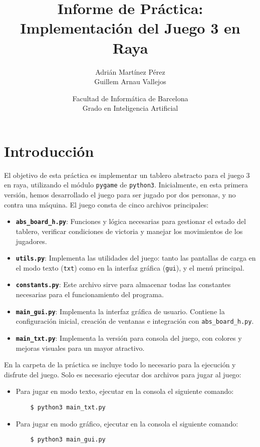 \documentclass[a4paper,12pt]{article}
\begin{document}
\title{Informe de Práctica: Implementación del Juego 3 en Raya}
\author{Adrián Martínez Pérez \\ Guillem Arnau Vallejos}
\date{Facultad de Informática de Barcelona\\Grado en Inteligencia Artificial}


\maketitle

\tableofcontents

\section*{Introducción}
El objetivo de esta práctica es implementar un tablero abstracto para el juego 3 en raya, utilizando el módulo
\texttt{pygame} de \texttt{python3}. Inicialmente, en esta primera versión, hemos desarrollado el juego para ser
 jugado por dos personas, y no contra una máquina. El juego consta de cinco archivos principales:

\begin{itemize}
    \item \textbf{\texttt{abs\_board\_h.py}}: Funciones y lógica necesarias para gestionar el estado del tablero,
    verificar condiciones de victoria y manejar los movimientos de los jugadores.
    \item \textbf{\texttt{utils.py}}: Implementa las utilidades del juego: tanto las pantallas de carga en el modo texto
    (\texttt{txt}) como en la interfaz gráfica (\texttt{gui}), y el menú principal.
    \item \textbf{\texttt{constants.py}}: Este archivo sirve para almacenar todas las constantes necesarias para el
    funcionamiento del programa.
    \item \textbf{\texttt{main\_gui.py}}: Implementa la interfaz gráfica de usuario. Contiene la configuración inicial,
    creación de ventanas e integración con \texttt{abs\_board\_h.py}.
    \item \textbf{\texttt{main\_txt.py}}: Implementa la versión para consola del juego, con colores y mejoras visuales
    para un mayor atractivo.
\end{itemize}

En la carpeta de la práctica se incluye todo lo necesario para la ejecución y disfrute del juego. Solo es necesario
ejecutar dos archivos para jugar al juego:

\begin{itemize}
    \item Para jugar en modo texto, ejecutar en la consola el siguiente comando:
    \begin{verbatim}
    $ python3 main_txt.py
    \end{verbatim}
    \item Para jugar en modo gráfico, ejecutar en la consola el siguiente comando:
    \begin{verbatim}
    $ python3 main_gui.py
    \end{verbatim}
\end{itemize}
\end{document}
